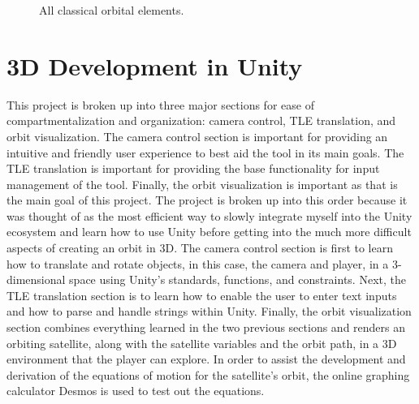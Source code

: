 \documentclass[conference]{IEEEtran}
\makeatletter
\newcommand*{\overrightharpoonup}{\mathpalette{\overarrow@\rightharpoonupfill@}}
\newcommand*{\rightharpoonupfill@}{\arrowfill@\relbar\relbar\rightharpoonup}
\renewcommand{\vec}[1]{\overrightharpoonup{\bm{\mathrm{#1}}}}
\makeatother
\begin{document}
\begin{figure}[hbtp]
\begin{center}
				\end{center}
				\caption{All classical orbital elements.}
				\label{figG}
			\end{figure}

	\section{3D Development in Unity}

		This project is broken up into three major sections for ease of compartmentalization and organization: camera control, TLE translation, and orbit visualization. The camera control section is important for providing an intuitive and friendly user experience to best aid the tool in its main goals. The TLE translation is important for providing the base functionality for input management of the tool. Finally, the orbit visualization is important as that is the main goal of this project. The project is broken up into this order because it was thought of as the most efficient way to slowly integrate myself into the Unity ecosystem and learn how to use Unity before getting into the much more difficult aspects of creating an orbit in 3D. The camera control section is first to learn how to translate and rotate objects, in this case, the camera and player, in a 3-dimensional space using Unity's standards, functions, and constraints. Next, the TLE translation section is to learn how to enable the user to enter text inputs and how to parse and handle strings within Unity. Finally, the orbit visualization section combines everything learned in the two previous sections and renders an orbiting satellite, along with the satellite variables and the orbit path, in a 3D environment that the player can explore. In order to assist the development and derivation of the equations of motion for the satellite's orbit, the online graphing calculator Desmos is used to test out the equations.
\end{document}
